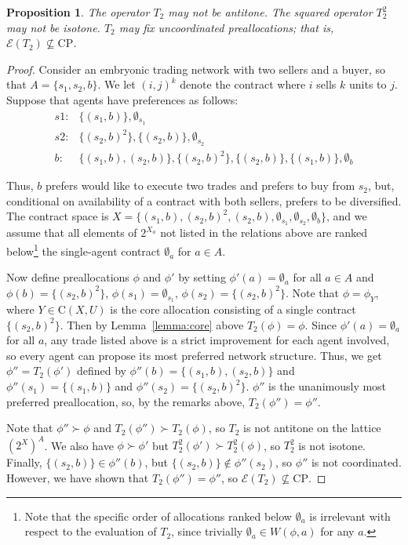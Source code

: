 \documentclass[11pt,reqno]{amsart}
\newtheorem{prop}[thm]{Proposition}
\theoremstyle{definition}
\numberwithin{equation}{section}
\newcommand{\prf}{\begin{proof}}
\newcommand{\eprf}{\end{proof}}
\newcommand{\pre}{\phi}
\newcommand{\coordpre}{\mathrm{CP}}
\newcommand{\prealloc}{(2^X)^A}
\newcommand{\sub}{\subseteq}
\newcommand{\core}{\mathrm{C}(X,U)}
\newcommand{\fix}{\mathcal{E}}
\newcommand{\su}{\succ}
\newcommand{\optwo}{T_2}
\begin{document}
\begin{prop} \label{prop:maxdom}
The operator $\optwo$ may not be antitone.
The squared operator $\optwo^2$ may not be isotone.
$\optwo$ may fix uncoordinated preallocations; that is, $\fix(\optwo) \not \sub \coordpre$.
\end{prop}
\prf 
Consider an embryonic trading network with two sellers and a buyer, so that $A = \{s_1,s_2,b\}$. 
We let $(i,j)^k$ denote the contract where $i$ sells $k$ units to $j$.
Suppose that agents have preferences as follows:
\begin{align*}
s1:& \{(s_1,b)\}, \emptyset_{s_1} \\
s2:& \{(s_2,b)^2\}, \{(s_2,b)\}, \emptyset_{s_2} \\
b:& \{(s_1,b), (s_2,b) \}, \{(s_2,b)^2\}, \{(s_2,b)\}, \{(s_1,b)\}, \emptyset_b
\end{align*}

Thus, $b$ prefers would like to execute two trades and prefers to buy from $s_2$, but, conditional on availability of a contract with both sellers, prefers to be diversified.
The contract space is $X = \{(s_1,b), (s_2,b)^2, (s_2,b), \emptyset_{s_1}, \emptyset_{s_2}, \emptyset_b\}$, and we assume that all elements of $2^{X_a}$ not listed in the relations above are ranked below\footnote{Note that the specific order of allocations ranked below $\emptyset_a$ is irrelevant with respect to the evaluation of $\optwo$, since trivially $\emptyset_a \in W(\pre,a)$ for any $a$.} the single-agent contract $\emptyset_a$ for $a \in A$.

Now define preallocations $\pre$ and $\pre'$ by setting $\pre'(a) = \emptyset_a$ for all $a \in A$ and $\pre(b) = \{(s_2,b)^2\}$, $\pre(s_1) = \emptyset_{s_1}$, $\pre(s_2) = \{(s_2,b)^2\}$.
Note that $\pre = \pre_Y$, where $Y \in \core$ is the core allocation consisting of a single contract $\{(s_2,b)^2\}$. 
Then by Lemma~\ref{lemma:core} above $\optwo(\pre) = \pre$.
Since $\pre'(a) = \emptyset_a$ for all $a$, any trade listed above is a strict improvement for each agent involved, so every agent can propose its most preferred network structure.
Thus, we get $\pre'' = \optwo(\pre')$ defined by $\pre''(b) = \{(s_1,b),(s_2,b)\}$ and $\pre''(s_1) = \{(s_1,b)\}$ and $\pre''(s_2) = \{(s_2,b)^2\}$.
$\pre''$ is the unanimously most preferred preallocation, so, by the remarks above, $\optwo(\pre'') = \pre''$.

Note that $\pre'' \su \pre$ and $\optwo(\pre'') \su \optwo(\pre)$, so $\optwo$ is not antitone on the lattice $\prealloc$.
We also have $\pre \su \pre'$ but $\optwo^2(\pre') \su \optwo^2(\pre)$, so $\optwo^2$ is not isotone.
Finally, $ \{(s_2,b)\} \in \pre''(b)$, but $\{(s_2,b)\} \not \in \pre''(s_2)$, so $\pre''$ is not coordinated.
However, we have shown that $\optwo(\pre'') = \pre''$, so $\fix(\optwo) \not \sub \coordpre$.
\eprf
\end{document}
